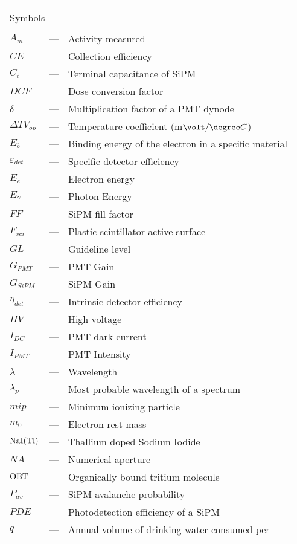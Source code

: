 \begin{longtable}{p{25mm} c p{120mm} }
\\
\\
\multicolumn{3}{l}{Symbols}\\
\\
$A_{m}$ & --- & Activity measured\\
$CE$ & --- & Collection efficiency\\
$C_t$ & --- & Terminal capacitance of SiPM\\
$DCF$ & --- & Dose conversion factor\\
$\delta$ & --- & Multiplication factor of a PMT dynode\\
$\Delta TV_{op}$ & --- & Temperature coefficient (m$\volt/\degree C$)\\
$E_b$ & --- & Binding energy of the electron in a specific material\\
$\varepsilon_{det}$ & --- & Specific detector efficiency\\
$E_e$ & --- & Electron energy\\
$E_\gamma$ & --- & Photon Energy\\
$FF$ & --- & SiPM fill factor\\
$F_{sci}$ & --- & Plastic scintillator active surface\\
$GL$ & --- & Guideline level\\
$G_{PMT}$ & --- & PMT Gain\\
$G_{SiPM}$ & --- & SiPM Gain\\
$\eta_{det}$ & --- & Intrinsic detector efficiency\\
$HV$ & --- & High voltage\\
$I_{DC}$ & --- & PMT dark current\\
$I_{PMT}$ & --- & PMT Intensity\\
$\lambda$ & --- & Wavelength\\
$\lambda_p$ & --- & Most probable wavelength of a spectrum\\
$mip$ & --- & Minimum ionizing particle\\
$m_0$ & --- & Electron rest mass\\
$\ce{NaI(Tl)}$ & --- & Thallium doped Sodium Iodide\\
$NA$ & --- & Numerical aperture\\
$\ce{OBT}$ & --- & Organically bound tritium molecule\\
$P_{av}$ & --- & SiPM avalanche probability\\
$PDE$ & --- & Photodetection efficiency of a SiPM\\
$q$ & --- & Annual volume of drinking water consumed per 

\end{longtable}
